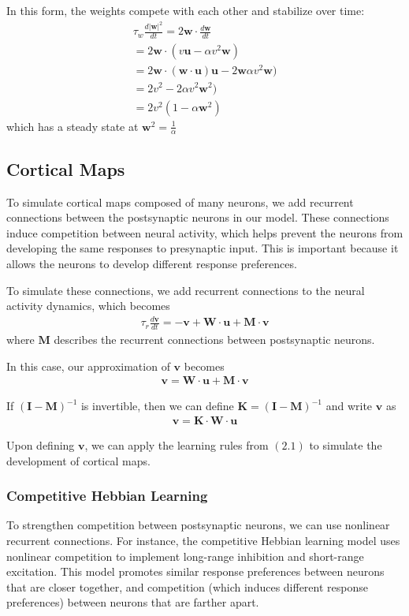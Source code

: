 \documentclass[pageno]{mat323paper}
\begin{document}
In this form, the weights compete with each other and stabilize over time:
\begin{align*}
\tau_w\frac{d|\mathbf{w}|^2}{dt}=2\mathbf{w}\cdot\frac{d\mathbf{w}}{dt}\\
=2\mathbf{w}\cdot(v\mathbf{u}-\alpha v^2\mathbf{w})\\
=2\mathbf{w}\cdot(\mathbf{w}\cdot\mathbf{u})\mathbf{u}-2\mathbf{w}\alpha v^2\mathbf{w})\\
=2v^2-2\alpha v^2\mathbf{w}^2)\\
=2v^2(1-\alpha\mathbf{w}^2)
\end{align*}
which has a steady state at $\mathbf{w}^2=\frac{1}{\alpha}$

\subsection{Cortical Maps}
To simulate cortical maps composed of many neurons, we add recurrent connections between the postsynaptic neurons in our model. These connections induce competition between neural activity, which helps prevent the neurons from developing the same responses to presynaptic input. This is important because it allows the neurons to develop different response preferences.

To simulate these connections, we add recurrent connections to the neural activity dynamics, which becomes
\begin{align}
\tau_r\frac{d\mathbf{v}}{dt}=-\mathbf{v}+\mathbf{W}\cdot\mathbf{u}+\mathbf{M}\cdot\mathbf{v}
\end{align}
where $\mathbf{M}$ describes the recurrent connections between postsynaptic neurons.

In this case, our approximation of $\mathbf{v}$ becomes
\begin{align}
\mathbf{v}=\mathbf{W}\cdot\mathbf{u}+\mathbf{M}\cdot\mathbf{v}
\end{align}

If $(\mathbf{I}-\mathbf{M})^{-1}$ is invertible, then we can define $\mathbf{K}=(\mathbf{I}-\mathbf{M})^{-1}$ and write $\mathbf{v}$ as
\begin{align}
\mathbf{v}=\mathbf{K}\cdot\mathbf{W}\cdot\mathbf{u}
\end{align}

Upon defining $\mathbf{v}$, we can apply the learning rules from $(2.1)$ to simulate the development of cortical maps.

\subsubsection{Competitive Hebbian Learning}
To strengthen competition between postsynaptic neurons, we can use nonlinear recurrent connections. For instance, the competitive Hebbian learning model uses nonlinear competition to implement long-range inhibition and short-range excitation. This model promotes similar response preferences between neurons that are closer together, and competition (which induces different response preferences) between neurons that are farther apart.
\end{document}
